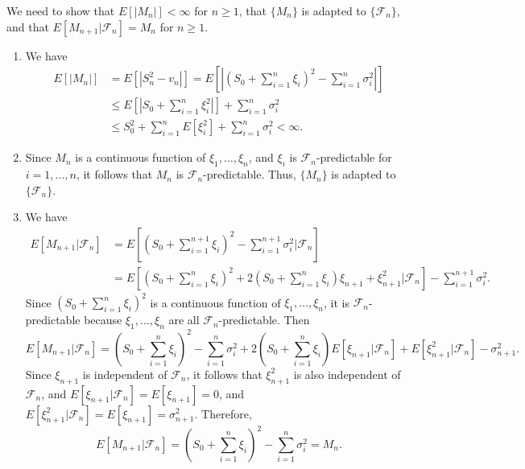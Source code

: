 \documentclass{homework}
\newcommand{\fil}{\mathcal{F}}
\begin{document}
	\maketitle
	
	\question We need to show that $E[|M_n|] < \infty$ for $n\ge 1$, that $\{M_n\}$ is adapted to $\{\fil_n\}$, and that $E[M_{n+1}|\fil_n] = M_n$ for $n \ge 1$.
	\begin{enumerate}
		\item We have
		\begin{align*}
			E[|M_n|] &= E\left[\left|S_n^2 - v_n\right|\right] = E\left[\left|\left(S_0 + \sum_{i=1}^n \xi_i\right)^2 - \sum_{i=1}^n \sigma_i^2\right|\right] \\
			&\le E\left[\left|S_0 + \sum_{i=1}^n\xi_i^2\right|\right] + \sum_{i=1}^n\sigma_i^2 \\
			&\le S_0^2 + \sum_{i=1}^nE[\xi_i^2] + \sum_{i=1}^n \sigma_i^2 <\infty.
		\end{align*}
		
		\item Since $M_n$ is a continuous function of $\xi_1, \dots, \xi_n$, and $\xi_i$ is $\fil_n$-predictable for $i =1,\dots, n$, it follows that $M_n$ is $\fil_n$-predictable. Thus, $\{M_n\}$ is adapted to $\{\fil_n\}$.
		
		\item We have
		\begin{align*}
			E[M_{n+1}|\fil_n] &= E\left[\left(S_0 + \sum_{i=1}^{n+1}\xi_i\right)^2 - \sum_{i=1}^{n+1}\sigma_i^2\bigg|\fil_n\right] \\
			&= E\left[\left(S_0 + \sum_{i=1}^n\xi_i\right)^2 + 2\left(S_0+\sum_{i=1}^n\xi_i\right)\xi_{n+1} + \xi_{n+1}^2\bigg|\fil_n\right] - \sum_{i=1}^{n+1}\sigma_i^2.
		\end{align*}
		Since $\left(S_0 + \sum\limits_{i=1}^n\xi_i\right)^2$ is a continuous function of $\xi_1,\dots, \xi_n$, it is $\fil_n$-predictable because $\xi_1,\dots,\xi_n$ are all $\fil_n$-predictable. Then
		\begin{equation*}
			E[M_{n+1}|\fil_n] = \left(S_0 + \sum_{i=1}^n\xi_i\right)^2 - \sum_{i=1}^n\sigma_i^2 + 2\left(S_0 + \sum_{i=1}^n\xi_i\right)E[\xi_{n+1}|\fil_n] + E[\xi_{n+1}^2|\fil_n] - \sigma_{n+1}^2.
		\end{equation*}
		Since $\xi_{n+1}$ is independent of $\fil_n$, it follows that $\xi_{n+1}^2$ is also independent of $\fil_n$, and $E[\xi_{n+1}|\fil_n] = E[\xi_{n+1}] = 0$, and $E[\xi_{n+1}^2|\fil_n] = E[\xi_{n+1}] = \sigma_{n+1}^2$. Therefore,
		\begin{equation*}
			E[M_{n+1}|\fil_n] = \left(S_0 + \sum_{i=1}^n\xi_i\right)^2 - \sum_{i=1}^n\sigma_i^2 = M_n.
		\end{equation*}
	\end{enumerate}
	
\end{document}
